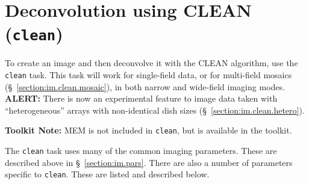 \section{Deconvolution using CLEAN ({\tt clean})}
\label{section:im.clean}

To create an image and then deconvolve it with the CLEAN algorithm,
use the {\tt clean} task.  This task will work for single-field data,
or for multi-field mosaics (\S~\ref{section:im.clean.mosaic}), in both
narrow and wide-field imaging modes.  
{\bf ALERT:} There is now an experimental feature to image data taken with
``heterogeneous'' arrays with non-identical dish sizes 
(\S~\ref{section:im.clean.hetero}).

{\bf Toolkit Note:} MEM is not included in {\tt clean}, but is
available in the toolkit.

The {\tt clean} task uses many
of the common imaging parameters.  These are described above in
\S~\ref{section:im.pars}.  There are also a number of parameters
specific to {\tt clean}.  These are listed and described below.

